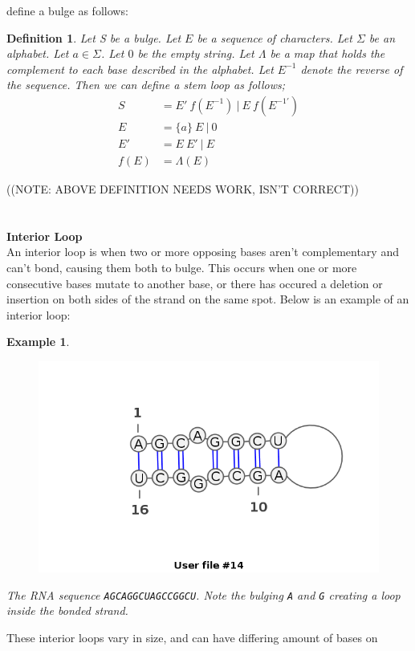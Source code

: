 \documentclass{article}
\newtheorem{myex}{Example}
\newtheorem{mydef}{Definition}
\begin{document}
define a bulge as follows:
\begin{mydef}\centering
Let S be a bulge. Let $E$ be a sequence of characters. Let $\Sigma$ be an alphabet. 
Let $a \in \Sigma$. Let $0$ be the empty string. Let $\Lambda$ be a map that holds the complement to each 
base described in the alphabet. Let $E^{-1}$ denote the reverse of the sequence. 
Then we can define a stem loop as follows;
\begin{align*}
S    &= E'~f(E^{-1})~|~E~f(E^{-1\prime})\\
E    &= \{a\}~E~|~0\\
E'   &= E~E'~|~E\\
f(E) &= \Lambda(E)
\end{align*}
\end{mydef}
((NOTE: ABOVE DEFINITION NEEDS WORK, ISN'T CORRECT))\\
\\\\
\textbf{Interior Loop}\\
An interior loop is when two or more opposing bases aren't complementary and 
can't bond, causing them both to bulge. This occurs when one or more 
consecutive bases mutate to another base, or there has occured a deletion or 
insertion on both sides of the strand on the same spot. Below is an example of an interior 
loop:
\begin{myex}\centering
\begin{figure}[h]
\includegraphics[scale=0.5]{interior-loop.png}
\end{figure}
The RNA sequence {\tt AGCAGGCUAGCCGGCU}. Note the bulging {\tt A} and {\tt G} 
creating a loop inside the bonded strand.
\end{myex}
These interior loops vary in size, and can have differing amount of bases on 
\end{document}

